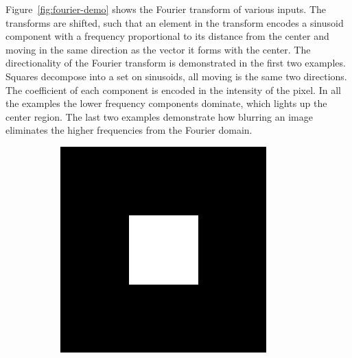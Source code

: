Figure~\ref{fig:fourier-demo} shows the Fourier transform of various inputs.
The transforms are shifted, such that an element in the transform encodes a sinusoid component with a frequency proportional to its distance from the center and moving in the same direction as the vector it forms with the center.
The directionality of the Fourier transform is demonstrated in the first two examples.
Squares decompose into a set on sinusoids, all moving is the same two directions.
The coefficient of each component is encoded in the intensity of the pixel.
In all the examples the lower frequency components dominate, which lights up the center region.
The last two examples demonstrate how blurring an image eliminates the higher frequencies from the Fourier domain.

\begin{figure}[htbp]
  \centering
  \begin{subfigure}[b]{0.2\textwidth}
    \centering
    \includegraphics[width=\textwidth]{figs/method/fourier/square_original.png}
    \vspace*{0.02\textwidth}
  \end{subfigure}%
  \hspace*{0.02\textwidth}
  \begin{subfigure}[b]{0.2\textwidth}
    \centering

\end{subfigure}
\end{figure}
